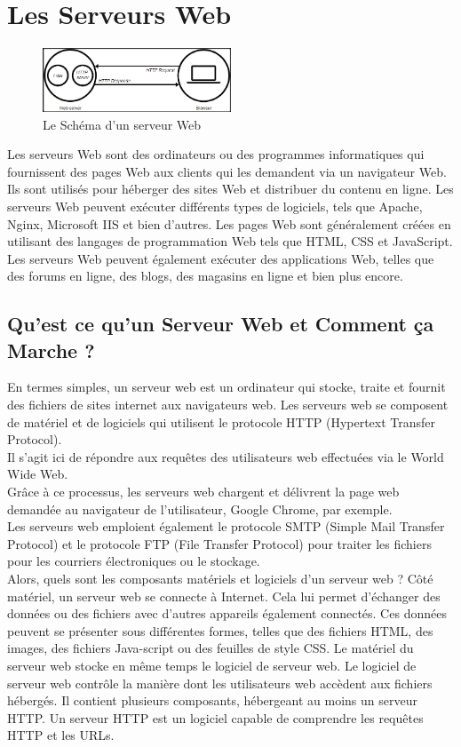 \section{Les Serveurs Web}  
\begin{figure}[h]
	\begin{center}		
	\includegraphics[width=0.5\textwidth]{PhotoMemoire/Server_web.png}
\caption{Le Schéma d'un serveur Web \cite{1}}
	\end{center}
\end{figure}

Les serveurs Web sont des ordinateurs ou des programmes informatiques qui fournissent des pages Web aux clients qui les demandent via un navigateur Web. Ils sont utilisés pour héberger des sites Web et distribuer du contenu en ligne. Les serveurs Web peuvent exécuter différents types de logiciels, tels que Apache, Nginx, Microsoft IIS et bien d'autres. Les pages Web sont généralement créées en utilisant des langages de programmation Web tels que HTML, CSS et JavaScript. Les serveurs Web peuvent également exécuter des applications Web, telles que des forums en ligne, des blogs, des magasins en ligne et bien plus encore.

\subsection{Qu’est ce qu’un Serveur Web et Comment ça Marche ?}
En termes simples, un serveur web est un ordinateur qui stocke, traite et fournit des fichiers de sites internet aux navigateurs web.
Les serveurs web se composent de matériel et de logiciels qui utilisent le protocole HTTP (Hypertext Transfer Protocol).\\
Il s’agit ici de répondre aux requêtes des utilisateurs web effectuées via le World Wide Web.\\
Grâce à ce processus, les serveurs web chargent et délivrent la page web demandée au navigateur de l’utilisateur, Google Chrome, par exemple.\\
Les serveurs web emploient également le protocole SMTP (Simple Mail Transfer Protocol) et le protocole FTP (File Transfer Protocol) pour traiter les fichiers pour les courriers électroniques ou le stockage.\\
Alors, quels sont les composants matériels et logiciels d’un serveur web ? Côté matériel, un serveur web se connecte à Internet. Cela lui permet d’échanger des données ou des fichiers avec d’autres appareils également connectés.\newpage
 Ces données peuvent se présenter sous différentes formes, telles que des fichiers HTML, des images, des fichiers Java-script ou des feuilles de style CSS. 
 Le matériel du serveur web stocke en même temps le logiciel de serveur web.
Le logiciel de serveur web contrôle la manière dont les utilisateurs web accèdent aux fichiers hébergés. Il contient plusieurs composants, hébergeant au moins un serveur HTTP. Un serveur HTTP est un logiciel capable de comprendre les requêtes HTTP et les URLs.\\
